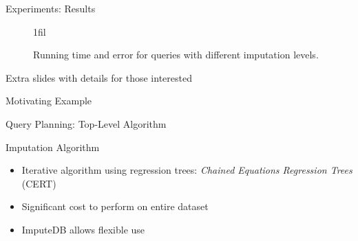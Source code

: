 \documentclass{beamer}
\makeatletter
\newcommand*{\centerfloat}{%
  \parindent \z@
  \leftskip \z@ \@plus 1fil \@minus \textwidth
  \rightskip\leftskip
  \parfillskip \z@skip}
\newcommand{\ProjectName}{ImputeDB}
\makeatother
\begin{document}
\begin{frame}[fragile]{Experiments: Results}
\begin{figure}
  \tiny
  \centerfloat
  
  \caption{Running time and error for queries with different imputation levels.}
  \label{fig:experiments}
\end{figure}
\end{frame}

\begin{frame}
	\center
	Extra slides with details for those interested
\end{frame}

\begin{frame}[fragile]{Motivating Example}
\end{frame}


\begin{frame}[fragile]{Query Planning: Top-Level Algorithm}

\begin{algorithm}[H]
\scriptsize

\end{algorithm}

\end{frame}

\begin{frame}[fragile]{Imputation Algorithm}
\begin{itemize}
	\item Iterative algorithm using regression trees: \textit{Chained Equations Regression Trees} (CERT)\cite{burgette2010multiple}
	\item Significant cost to perform on entire dataset
	\item \ProjectName{} allows flexible use
\end{itemize}
\scriptsize

\begin{algorithm}[H]
\scriptsize

\end{algorithm}
\end{frame}
\end{document}
